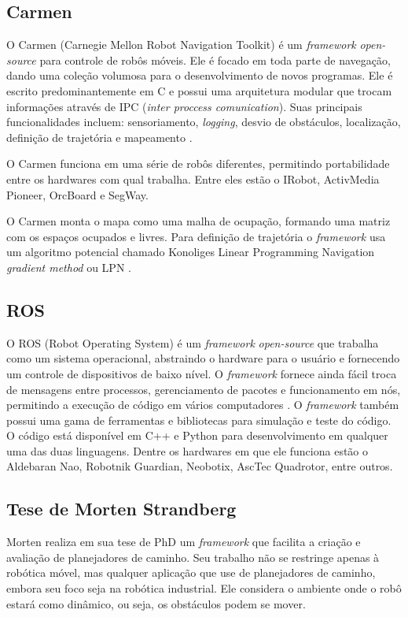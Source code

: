 \subsection{Carmen}

O Carmen (Carnegie Mellon Robot Navigation Toolkit) é um \textit{framework} \textit{open-source} para controle de robôs móveis. Ele é focado em toda parte de navegação, dando uma coleção volumosa para o desenvolvimento de novos programas. Ele é escrito predominantemente em C e possui uma arquitetura modular que trocam informações através de IPC (\textit{inter proccess comunication}). Suas principais funcionalidades incluem: sensoriamento, \textit{logging}, desvio de obstáculos, localização, definição de trajetória e mapeamento \cite{CARMEN_SITE}. 

O Carmen funciona em uma série de robôs diferentes, permitindo portabilidade entre os hardwares com qual trabalha. Entre eles estão o IRobot, ActivMedia Pioneer, OrcBoard e SegWay.

O Carmen monta o mapa como uma malha de ocupação, formando uma matriz com os espaços ocupados e livres. Para definição de trajetória o \textit{framework} usa um algoritmo potencial chamado Konoliges Linear Programming Navigation \textit{gradient method} ou LPN \cite{Thomsen2010}.

\subsection{ROS}

O ROS (Robot Operating System) é um \textit{framework} \textit{open-source} que trabalha como um sistema operacional, abstraindo o hardware para o usuário e fornecendo um controle de dispositivos de baixo nível. O \textit{framework} fornece ainda fácil troca de mensagens entre processos, gerenciamento de pacotes e funcionamento em nós, permitindo a execução de código em vários computadores \cite{ROS_SITE}. O \textit{framework} também possui uma gama de ferramentas e bibliotecas para simulação e teste do código. O código está disponível em C++ e Python para desenvolvimento em qualquer uma das duas linguagens. Dentre os hardwares em que ele funciona estão o Aldebaran Nao, Robotnik Guardian, Neobotix, AscTec Quadrotor, entre outros.

\subsection{Tese de Morten Strandberg}

Morten \cite{Strandberg2004} realiza em sua tese de PhD um \textit{framework} que facilita a criação e avaliação de planejadores de caminho. Seu trabalho não se restringe apenas à robótica móvel, mas qualquer aplicação que use de planejadores de caminho, embora seu foco seja na robótica industrial. Ele considera o ambiente onde o robô estará como dinâmico, ou seja, os obstáculos podem se mover.

